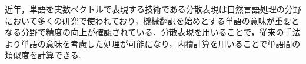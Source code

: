 近年，単語を実数ベクトルで表現する技術である分散表現は自然言語処理の分野において多くの研究で使われており，機械翻訳を始めとする単語の意味が重要となる分野で精度の向上が確認されている．分散表現を用いることで，従来の手法より単語の意味を考慮した処理が可能になり，内積計算を用いることで単語間の類似度を計算できる.
\begin{comment}
2013年頃からWeb上での大規模な議論活動が活発になり，大規模な人数での議論が期待されている．
大規模な議論では意見を共有することは可能であるが，議論を整理させることや収束させることは難しい．以上から大規模意見集約システムCOLLAGREEが開発された．本システムではWeb上で適切に大規模な議論を行うことができるように議論をマネジメントするファシリテーターを導入した\cite{collagreeTest}．
過去の実験ではファシリテーターの存在が議論の集約に大きな役割を果たしていることが認識されており，大規模な議論のためにファシリテータは必要である．しかし，議論の規模に伴って議論時間が長くなる傾向があり，同時にファシリテーターは常に議論の動向を見続ける必要がある．故に，議論の規模が大きくなればなるほどファシリテーターは長時間かつ大規模な議論の動向の監視によって大きな負担がかかる．大規模な議論が増加する傾向を踏まえるとファシリテーターにかかる負担を軽減する支援が必要である．\\
以上の問題を解決するため，話題の変化を追い，重要な話題の転換点をファシリテーターの代わりに検出することが有用であると考える．必要な時にだけファシリテーターが画面を見れば良いようにすることでファシリテーターの負担軽減が期待できる．
議論支援に関する先行研究においてファシリテーターに対する支援を目的としたものは無く，殆どが議論の活性化や可視化を目的としている．
近年，自然言語処理の分野において分散表現が多くの研究で使われており．分散表現は文字列である単語を辞書データを使用して実数ベクトルへと変換する．辞書データにない単語には対応できないが，多様な処理を１つの辞書データで行うことができる．また，実数ベクトルの各数値が単語の意味を表現するものとなっており，数値を使用して処理を行うことができる．

\end{comment}
